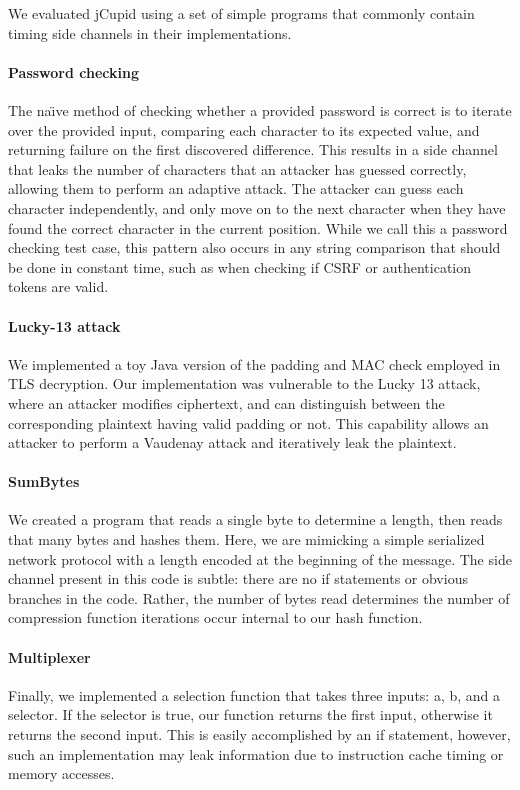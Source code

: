 

We evaluated jCupid using a set of simple programs that commonly contain timing
side channels in their implementations.


\paragraph{Password checking}
The na\"{\i}ve method of checking whether a provided password is correct is to iterate
over the provided input, comparing each character to its expected value, and
returning failure on the first discovered difference. This results in a side
channel that leaks the number of characters that an attacker has guessed
correctly, allowing them to perform an adaptive attack. The attacker can guess
each character independently, and only move on to the next character when they
have found the correct character in the current position. While we call this a
password checking test case, this pattern also occurs in any string comparison
that should be done in constant time, such as when checking if CSRF or
authentication tokens are valid.

\paragraph{Lucky-13 attack}
We implemented a toy Java version of the padding and MAC check employed in TLS
decryption. Our implementation was vulnerable to the Lucky 13 attack, where
an attacker modifies ciphertext, and can distinguish between the corresponding
plaintext having valid padding or not. This capability allows an attacker to
perform a Vaudenay attack and iteratively leak the plaintext.

\paragraph{SumBytes}
We created a program that reads a single byte to determine a length, then reads
that many bytes and hashes them. Here, we are mimicking a simple serialized
network protocol with a length encoded at the beginning of the message. The side
channel present in this code is subtle: there are no if statements or obvious
branches in the code. Rather, the number of bytes read determines the number of
compression function iterations occur internal to our hash function.

\paragraph{Multiplexer}
Finally, we implemented a selection function that takes three inputs: a, b, and
a selector. If the selector is true, our function returns the first input,
otherwise it returns the second input. This is easily accomplished by an if
statement, however, such an implementation may leak information due to instruction cache timing or
memory accesses.



